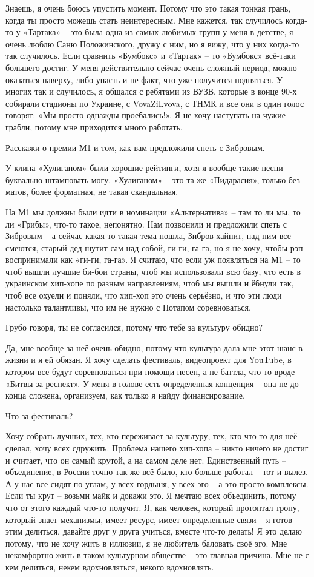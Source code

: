 Знаешь, я очень боюсь упустить момент. Потому что это такая тонкая грань, когда
ты просто можешь стать неинтересным. Мне кажется, так случилось когда-то у
«Тартака» – это была одна из самых любимых групп у меня в детстве,   я очень
люблю Саню Положинского, дружу с ним, но я вижу, что у них когда-то так
случилось. Если сравнить «Бумбокс» и «Тартак» – то «Бумбокс» всё-таки большего
достиг. У меня действительно сейчас очень сложный период, можно оказаться
наверху, либо упасть и не факт, что уже получится подняться. У многих так и
случилось, я общался с ребятами из ВУЗВ, которые в конце 90-х собирали стадионы
по Украине, с VovaZiLvova, с ТНМК и все они в один голос говорят: «Мы просто
однажды проебались!». Я не хочу наступать на чужие грабли, потому мне
приходится много работать.

Расскажи о премии М1 и том, как вам предложили спеть с Зибровым.

У клипа «Хулиганом» были хорошие рейтинги, хотя я вообще такие песни буквально
штамповать могу. «Хулиганом» – это та же «Пидарасия», только без матов, более
форматная, не такая скандальная.

На М1 мы должны были идти в номинации «Альтернатива» – там то ли мы, то ли
«Грибы», что-то такое, непонятно. Нам позвонили и предложили спеть с Зибровым –
а сейчас какая-то такая тема пошла, Зибров хайпит, над ним все смеются, старый
дед шутит сам над собой, ги-ги, га-га, но я не хочу, чтобы рэп воспринимали как
«ги-ги, га-га». Я считаю, что если уж появляться на М1 – то чтоб вышли лучшие
би-бои страны, чтоб мы использовали всю базу, что есть в украинском хип-хопе по
разным направлениям, чтоб мы вышли и ёбнули так, чтоб все охуели и поняли, что
хип-хоп это очень серьёзно, и что эти люди настолько талантливы, что им не
нужно с Потапом соревноваться.

Грубо говоря, ты не согласился, потому что тебе за культуру обидно?

Да, мне вообще за неё очень обидно, потому что культура дала мне этот шанс в
жизни и я ей обязан. Я хочу сделать фестиваль, видеопроект для YouTube, в
котором все будут соревноваться при помощи песен, а не баттла, что-то вроде
«Битвы за респект». У меня в голове есть определенная концепция – она не до
конца сложена, организуем, как только я найду финансирование.

Что за фестиваль?

Хочу собрать лучших, тех, кто переживает за культуру, тех, кто что-то для неё
сделал, хочу всех сдружить. Проблема нашего хип-хопа – никто ничего не достиг и
считает, что он самый крутой, а на самом деле нет. Единственный путь –
объединение, в России точно так же всё было, кто больше работал – тот и вылез.
А у нас все сидят по углам, у всех гордыня, у всех эго – а это просто
комплексы. Если ты крут – возьми майк и докажи это. Я мечтаю всех объединить,
потому что от этого каждый что-то получит. Я, как человек, который протоптал
тропу, который знает механизмы, имеет ресурс, имеет определенные связи – я
готов этим делиться, давайте друг у друга учиться, вместе что-то делать! Я это
делаю потому, что не хочу жить в иллюзии, я не любитель баловать своё эго. Мне
некомфортно жить в таком культурном обществе – это главная причина. Мне не с
кем делиться, некем вдохновляться, некого вдохновлять.  

